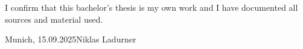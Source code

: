 
\vspace*{\fill}

\noindent I confirm that this bachelor's thesis is my own work and I have documented all sources and material used.


\vspace*{\fill}

\noindent Munich, 15.09.2025\hfill Niklas Ladurner

\MediaOptionLogic